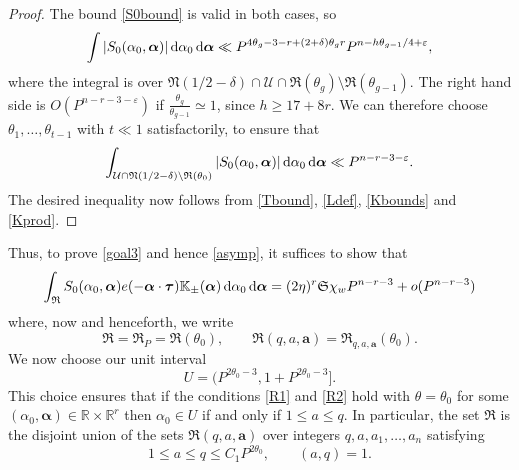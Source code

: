 \documentclass[12pt,reqno]{amsart}
\theoremstyle{definition}
\theoremstyle{remark}
\numberwithin{equation}{section}
\begin{document}
\begin{proof}
The bound \eqref{S0bound} is valid in both cases, so
\[
\int |S_0({{\alpha}}_0,{\boldsymbol{{\alpha}}})| {{\,{\rm d}}} {{\alpha}}_0{{\,{\rm d}}} {\boldsymbol{{\alpha}}}
\ll  P^{4 {{\theta}}_g - 3 - r + (2+{{\delta}}) {{\theta}}_g r} P^{n-h {{\theta}}_{g-1} /4 + {\varepsilon}},
\]
where the integral is over ${\mathfrak N}(1/2-{{\delta}}) \cap {\mathcal U} \cap  {\mathfrak R}({{\theta}}_g) \setminus {\mathfrak R}({{\theta}}_{g-1})$. The right hand side is $O(P^{n-r-3-{\varepsilon}})$ if $\frac{{{\theta}}_g}{{{\theta}}_{g-1}} \simeq 1$, since $h {\geqslant} 17 + 8r$. We can therefore choose ${{\theta}}_1, \ldots, {{\theta}}_{t-1}$ with $t \ll 1$ satisfactorily, to ensure that
\[
\int_{{\mathcal U} \cap {\mathfrak N}(1/2-{{\delta}}) \setminus {\mathfrak R}({{\theta}}_0)} |S_0({{\alpha}}_0,{\boldsymbol{{\alpha}}})| {{\,{\rm d}}} {{\alpha}}_0 {{\,{\rm d}}} {\boldsymbol{{\alpha}}}
\ll P^{n-r-3-{\varepsilon}}.
\]
The desired inequality now follows from \eqref{Tbound}, \eqref{Ldef}, \eqref{Kbounds} and \eqref{Kprod}. 
\end{proof}

Thus, to prove \eqref{goal3} and hence \eqref{asymp}, it suffices to show that
\begin{equation} \label{goal4}
\int_{\mathfrak R} S_0({{\alpha}}_0,{\boldsymbol{{\alpha}}}) e(-{\boldsymbol{{\alpha}}} \cdot {\boldsymbol{\tau}}) {\mathbb K}_\pm({\boldsymbol{{\alpha}}}) {{\,{\rm d}}} {{\alpha}}_0 {{\,{\rm d}}} {\boldsymbol{{\alpha}}} 
= (2 \eta)^r {\mathfrak S} \chi_w P^{n-r-3} + o(P^{n-r-3})
\end{equation}
where, now and henceforth, we write
\[
{\mathfrak R} = {\mathfrak R}_P = {\mathfrak R}({{\theta}}_0), \qquad {\mathfrak R}(q,a,{\mathbf a}) = {\mathfrak R}_{q,a,{\mathbf a}}({{\theta}}_0).
\]
We now choose our unit interval
\begin{equation} \label{interval}
U = (P^{2 {{\theta}}_0 - 3}, 1 + P^{2 {{\theta}}_0 - 3}].
\end{equation}
This choice ensures that if the conditions \eqref{R1} and \eqref{R2} hold with ${{\theta}} = {{\theta}}_0$ for some $({{\alpha}}_0,{\boldsymbol{{\alpha}}}) \in {\mathbb R} \times {\mathbb R}^r$ then ${{\alpha}}_0 \in U$ if and only if $1 {\leqslant} a {\leqslant} q$. In particular, the set ${\mathfrak R}$ is the disjoint union of the sets ${\mathfrak R}(q,a,{\mathbf a})$ over integers $q,a,a_1,\ldots,a_n$ satisfying 
\begin{equation} \label{R2b}
1 {\leqslant} a {\leqslant} q {\leqslant} C_1 P^{2{{\theta}}_0}, \qquad (a,q) = 1.
\end{equation}
\end{document}
